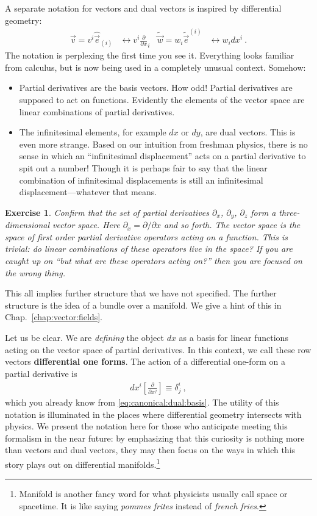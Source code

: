 \documentclass[
  11pt,
	colorful,
	raggedright,
]{tufte-style-thesis-flip}
\newtheorem{exercise}{Exercise}[section]
\begin{document}
A separate notation for vectors and dual vectors is inspired by differential geometry: 
\begin{align}
  \vec{v}=v^i \hat{\vec{e}}_{(i)} &\leftrightarrow v^i \frac{\partial}{\partial x}_i
  &
  \tilde{\vec w}=w_i \tilde{\vec{e}}^{(i)} &\leftrightarrow w_i dx^i \ .
\end{align}
The notation is perplexing the first time you see it. Everything looks familiar from calculus, but is now being used in a completely unusual context. Somehow:
\begin{itemize}
   \item Partial derivatives are the basis vectors. How odd! Partial derivatives are supposed to act on functions. Evidently the elements of the vector space are linear combinations of partial derivatives. 
   \item The infinitesimal elements, for example $dx$ or $dy$, are dual vectors. This is even more strange. Based on our intuition from freshman physics, there is no sense in which an ``infinitesimal displacement'' acts on a partial derivative to spit out a number! Though it is perhaps fair to say that the linear combination of infinitesimal displacements is still an infinitesimal displacement---whatever that means.
 \end{itemize} 
 \begin{exercise}
 Confirm that the set of partial derivatives $\partial_x$, $\partial_y$, $\partial_z$ form a three-dimensional vector space. Here $\partial_x = \partial/\partial x$ and so forth. The vector space is the space of first order partial derivative operators acting on a function. This is trivial: do linear combinations of these operators live in the space? If you are caught up on ``but what are these operators acting on?'' then you are focused on the wrong thing.
 \end{exercise}
 This all implies further structure that we have not specified. The further structure is the idea of a bundle over a manifold. We give a hint of this in Chap.~\ref{chap:vector:fields}.

 Let us be clear. We are \emph{defining} the object $dx$ as a basis for linear functions acting on the vector space of partial derivatives. In this context, we call these row vectors \textbf{differential one forms}. The action of a differential one-form on a partial derivative is
 \begin{align}
   dx^i\left[\frac{\partial}{\partial x^j}\right] \equiv \delta^i_j \ ,
 \end{align}
 which you already know from \eqref{eq:canonical:dual:basis}. The utility of this notation is illuminated in the places where differential geometry intersects with physics. We present the notation here for those who anticipate meeting this formalism in the near future: by emphasizing that this curiosity is nothing more than vectors and dual vectors, they may then focus on the ways in which this story plays out on differential manifolds.\footnote{Manifold is another fancy word for what physicists usually call space or spacetime. It is like saying \emph{pommes frites} instead of \emph{french fries}.} 
 
\end{document}
